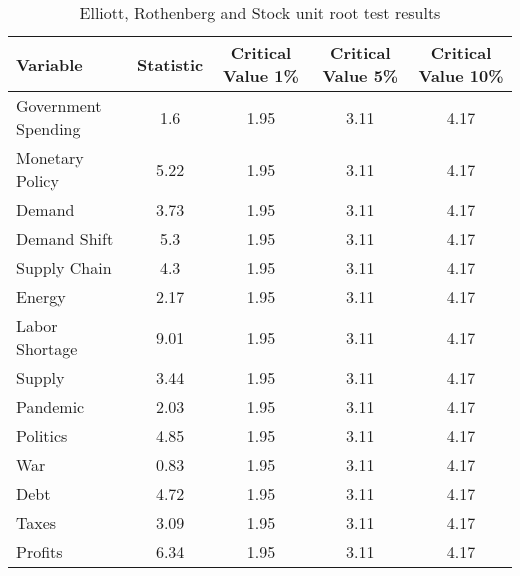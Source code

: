 \begin{sidewaystable}[H]
\centering
\caption{Elliott, Rothenberg and Stock unit root test results \citep{elliott.1992}}\label{table:ers}

\begin{tabular}{lcccc}
\toprule
\textbf{Variable} & \textbf{Statistic} & \textbf{Critical Value 1\%} & \textbf{Critical Value 5\%} & \textbf{Critical Value 10\%} \\
\midrule
Government Spending & 1.6 & 1.95 & 3.11 & 4.17 \\
Monetary Policy & 5.22 & 1.95 & 3.11 & 4.17 \\
Demand & 3.73 & 1.95 & 3.11 & 4.17 \\
Demand Shift & 5.3 & 1.95 & 3.11 & 4.17 \\
Supply Chain & 4.3 & 1.95 & 3.11 & 4.17 \\
Energy & 2.17 & 1.95 & 3.11 & 4.17 \\
Labor Shortage & 9.01 & 1.95 & 3.11 & 4.17 \\
Supply & 3.44 & 1.95 & 3.11 & 4.17 \\
Pandemic & 2.03 & 1.95 & 3.11 & 4.17 \\
Politics & 4.85 & 1.95 & 3.11 & 4.17 \\
War & 0.83 & 1.95 & 3.11 & 4.17 \\
Debt & 4.72 & 1.95 & 3.11 & 4.17 \\
Taxes & 3.09 & 1.95 & 3.11 & 4.17 \\
Profits & 6.34 & 1.95 & 3.11 & 4.17 \\
\bottomrule
\end{tabular}
\end{sidewaystable}
